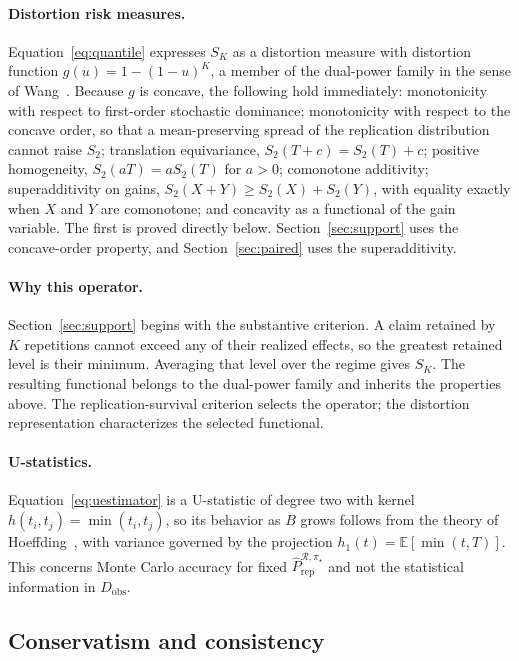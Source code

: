 \documentclass[11pt]{article}
\newcommand{\Regime}{\mathcal{R}}
\newcommand{\E}{\mathbb{E}}
\newcommand{\PRepHat}{\widehat{P}_{\mathrm{rep}}^{\Regime,\pi_\star}}
\theoremstyle{remark}
\begin{document}
\paragraph{Distortion risk measures.}
Equation~\eqref{eq:quantile} expresses $S_K$ as a distortion measure with distortion function $g(u)=1-(1-u)^{K}$, a member of the dual-power family in the sense of Wang~\cite{wang1996premium}. Because $g$ is concave, the following hold immediately: monotonicity with respect to first-order stochastic dominance; monotonicity with respect to the concave order, so that a mean-preserving spread of the replication distribution cannot raise $S_2$; translation equivariance, $S_2(T+c)=S_2(T)+c$; positive homogeneity, $S_2(aT)=aS_2(T)$ for $a>0$; comonotone additivity; superadditivity on gains, $S_2(X+Y)\geq S_2(X)+S_2(Y)$, with equality exactly when $X$ and $Y$ are comonotone; and concavity as a functional of the gain variable. The first is proved directly below. Section~\ref{sec:support} uses the concave-order property, and Section~\ref{sec:paired} uses the superadditivity.

\paragraph{Why this operator.}
Section~\ref{sec:support} begins with the substantive criterion. A claim retained by $K$ repetitions cannot exceed any of their realized effects, so the greatest retained level is their minimum. Averaging that level over the regime gives $S_K$. The resulting functional belongs to the dual-power family and inherits the properties above. The replication-survival criterion selects the operator; the distortion representation characterizes the selected functional.

\paragraph{U-statistics.}
Equation~\eqref{eq:uestimator} is a U-statistic of degree two with kernel $h(t_i,t_j)=\min(t_i,t_j)$, so its behavior as $B$ grows follows from the theory of Hoeffding~\cite{hoeffding1948ustat}, with variance governed by the projection $h_1(t)=\E[\min(t,T)]$. This concerns Monte Carlo accuracy for fixed $\PRepHat$ and not the statistical information in $D_{\mathrm{obs}}$.

\subsection{Conservatism and consistency}
\end{document}
